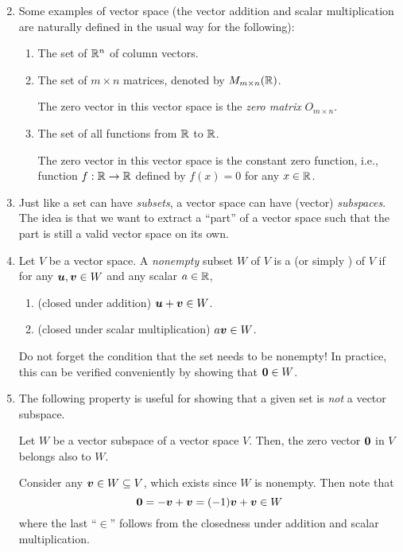 \begin{enumerate}
\begin{pf}
\begin{enumerate}
\[\]
\end{enumerate}
\end{pf}
\item Some examples of vector space (the vector addition and scalar
multiplication are naturally defined in the usual way for the following):
\begin{enumerate}
\item The set of \(\mathbb{R}^n\) of column vectors.
\item The set of \(m\times n\) matrices, denoted by \(M_{m\times n}(\mathbb{R})\).
\begin{note}
The zero vector in this vector space is the \emph{zero matrix} \(O_{m\times n}\).
\end{note}
\item The set of all functions from \(\mathbb{R}\) to \(\mathbb{R}\).
\begin{note}
The zero vector in this vector space is the constant zero function, i.e.,
function \(f:\mathbb{R} \to\mathbb{R}\) defined by \(f(x)=0\) for any \(x\in\mathbb{R}\).
\end{note}
\end{enumerate}
\item Just like a set can have \emph{subsets}, a vector space can have (vector)
\emph{subspaces}. The idea is that we want to extract a ``part'' of a vector
space such that the part is still a valid vector space on its own.

\item Let \(V\) be a vector space. A \emph{nonempty} subset \(W\) of \(V\) is a
 (or simply ) of \(V\) if for any
\(\vb*{u},\vb*{v}\in W\) and any scalar \(a\in\mathbb{R}\),
\begin{enumerate}
\item (closed under addition) \(\vb*{u}+\vb*{v}\in W\).
\item (closed under scalar multiplication) \(a\vb*{v}\in W\).
\end{enumerate}
\begin{warning}
Do not forget the condition that the set needs to be nonempty! In practice,
this can be verified conveniently by showing that \(\vb*{0}\in W\).
\end{warning}
\item The following property is useful for showing that a given set is
\emph{not} a vector subspace.
\begin{proposition}
\label{prp:vec-subsp-contain-zero}
Let \(W\) be a vector subspace of a vector space \(V\). Then, the zero vector
\(\vb*{0}\) in \(V\) belongs also to \(W\).
\end{proposition}
\begin{pf}
Consider any \(\vb*{v}\in W\subseteq V\), which exists since \(W\) is
nonempty. Then note that
\[
\vb*{0}=-\vb*{v}+\vb*{v}=(-1)\vb*{v}+\vb*{v}\in W
\]
where the last ``\(\in\)'' follows from the closedness under addition and
scalar multiplication.
\end{pf}


\end{enumerate}
